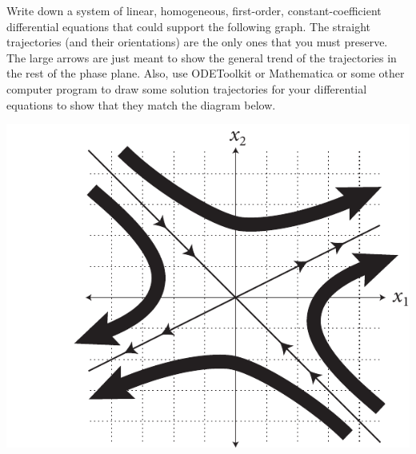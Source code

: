 \documentclass[12pt,letterpaper]{hmcpset}
\begin{document}
\begin{problem}[3]
    Write down a system of linear, homogeneous, first-order,
    constant-coefficient differential equations that could support the
    following graph.  The straight trajectories (and their
    orientations) are the only ones that you must preserve.  The large
    arrows are just meant to show the general trend of the
    trajectories in the rest of the phase plane.  Also, use ODEToolkit
    or Mathematica or some other computer program to draw some
    solution trajectories for your differential equations to show that
    they match the diagram below.
    \begin{center}
        \includegraphics[scale=0.8]{img/may_26_3}
    \end{center}
\end{problem}
\begin{solution}
    \vfill
\end{solution}
\newpage
\end{document}
